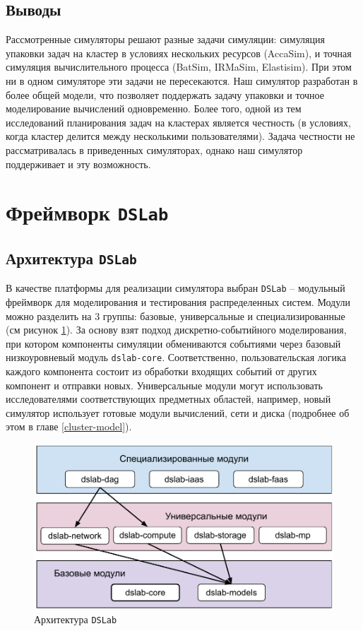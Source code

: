 \subsection{Выводы}

Рассмотренные симуляторы решают разные задачи симуляции: симуляция упаковки задач на кластер в условиях нескольких ресурсов (AccaSim), и точная симуляция вычислительного процесса (BatSim, IRMaSim, Elastisim). При этом ни в одном симуляторе эти задачи не пересекаются. Наш симулятор разработан в более общей модели, что позволяет поддержать задачу упаковки и точное моделирование вычислений одновременно. Более того, одной из тем исследований планирования задач на кластерах является честность (в условиях, когда кластер делится между несколькими пользователями). Задача честности не рассматривалась в приведенных симуляторах, однако наш симулятор поддерживает и эту возможность.



\section{Фреймворк \texttt{DSLab}}\label{sec:dslab}

\subsection{Архитектура \texttt{DSLab}}


В качестве платформы для реализации симулятора выбран \texttt{DSLab} -- модульный фреймворк для моделирования и тестирования распределенных систем. Модули можно разделить на 3 группы: базовые, универсальные и специализированные (см рисунок \ref{fig:dslab_arc}). За основу взят подход дискретно-событийного моделирования, при котором компоненты симуляции обмениваются событиями через базовый низкоуровневый модуль \texttt{dslab-core}. Соответственно, пользовательская логика каждого компонента состоит из обработки входящих событий от других компонент и отправки новых. Универсальные модули могут использовать исследователями соответствующих предметных областей, например, новый симулятор использует готовые модули вычислений, сети и диска (подробнее об этом в главе \ref{cluster-model}). 

\begin{figure}[H]
    \centering
\includegraphics[width=0.7\linewidth]{images/dslab_arc}
\caption{Архитектура \texttt{DSLab}}
\label{fig:dslab_arc}
\end{figure}

